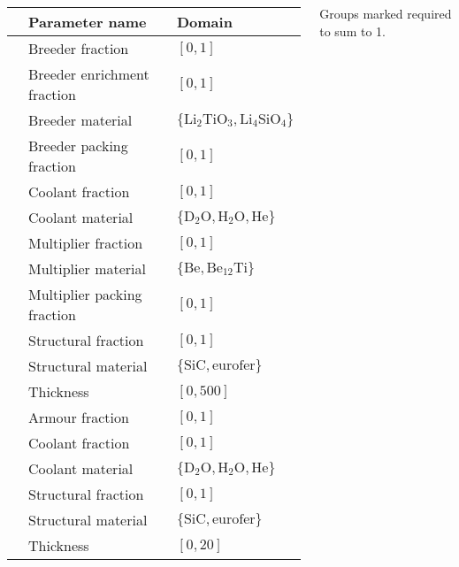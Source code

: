 \begin{frame}
\begin{columns}[T]
		\vspace{5pt}
		{\fontsize{8pt}{8pt}\selectfont
		\setlength\tabcolsep{3pt}
		\begin{tabular}{l|ll}
		\toprule
		{} & Parameter name & Domain\\
		\midrule
		\parbox[t]{2mm}{\hspace{-2pt}}
		   & Breeder fraction\textsuperscript{\textdagger} & $[0,1]$\\
		   & Breeder  enrichment fraction & $[0,1]$\\
		   & Breeder material & $\{\text{Li}_2\text{TiO}_3, \text{Li}_4\text{SiO}_4\}$\\
		   & Breeder packing fraction & $[0,1]$\\
		   & Coolant fraction\textsuperscript{\textdagger} & $[0,1]$\\
		   & Coolant material & $\{\text{D}_2\text{O}, \text{H}_2\text{O}, \text{He}\}$\\
		   & Multiplier fraction\textsuperscript{\textdagger} & $[0,1]$\\
		   & Multiplier material & $\{\text{Be}, \text{Be}_{12}\text{Ti}\}$\\
		   & Multiplier packing fraction & $[0,1]$\\
		   & Structural fraction\textsuperscript{\textdagger} & $[0,1]$\\
		   & Structural material & $\{\text{SiC}, \text{eurofer}\}$\\
		   & Thickness & $[0,500]$\\
		\midrule
		\parbox[t]{2mm}{\hspace{-2pt}}
		   & Armour fraction\textsuperscript{\textdaggerdbl} & $[0,1]$\\
		   & Coolant fraction\textsuperscript{\textdaggerdbl} & $[0,1]$\\
		   & Coolant material & $\{\text{D}_2\text{O}, \text{H}_2\text{O}, \text{He}\}$\\
		   & Structural fraction\textsuperscript{\textdaggerdbl} & $[0,1]$\\
		   & Structural material & $\{\text{SiC}, \text{eurofer}\}$\\
		   & Thickness & $[0,20]$\\
		\bottomrule
		\end{tabular}
		}

		{\tiny
		Groups marked\textsuperscript{\textdagger\textdaggerdbl}
		required to sum to 1.
		}

    \end{columns}
\end{frame}

